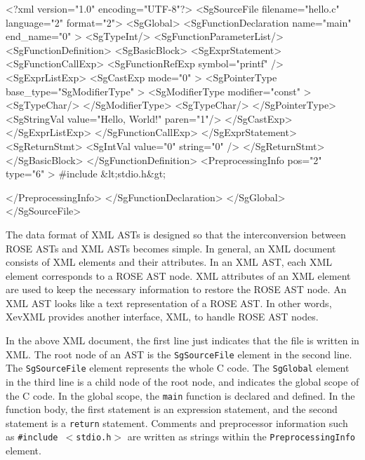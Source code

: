 \begin{framed}
\begin{src}
<?xml version="1.0" encoding="UTF-8"?>
<SgSourceFile filename="hello.c" language="2" format="2">
  <SgGlobal>
    <SgFunctionDeclaration name="main"  end_name="0" >
        <SgTypeInt/>
      <SgFunctionParameterList/>
      <SgFunctionDefinition>
        <SgBasicBlock>
          <SgExprStatement>
            <SgFunctionCallExp>
              <SgFunctionRefExp symbol="printf" />
              <SgExprListExp>
                <SgCastExp mode="0" >
                    <SgPointerType base_type="SgModifierType" >
                      <SgModifierType modifier="const" >
                        <SgTypeChar/>
                      </SgModifierType>
                      <SgTypeChar/>
                    </SgPointerType>
                  <SgStringVal value="Hello, World!\n" paren="1"/>
                </SgCastExp>
              </SgExprListExp>
            </SgFunctionCallExp>
          </SgExprStatement>
          <SgReturnStmt>
            <SgIntVal value="0"  string="0" />
          </SgReturnStmt>
        </SgBasicBlock>
      </SgFunctionDefinition>
<PreprocessingInfo pos="2"  type="6" >
#include &lt;stdio.h&gt;

</PreprocessingInfo>
    </SgFunctionDeclaration>
  </SgGlobal>
</SgSourceFile>
\end{src}
\end{framed}

The data format of XML ASTs is designed so that the interconversion
between ROSE ASTs and XML ASTs becomes simple.  In general, an XML
document consists of XML elements and their attributes. In an XML AST,
each XML element corresponds to a ROSE AST node. XML attributes of an
XML element are used to keep the necessary information to restore the
ROSE AST node.  An XML AST looks like a text representation of a ROSE
AST.  In other words, XevXML provides another interface, XML, to handle
ROSE AST nodes.

In the above XML document, the first line just indicates that the file
is written in XML.  The root node of an AST is the \texttt{SgSourceFile}
element in the second line. The \texttt{SgSourceFile} element represents
the whole C code.  The \texttt{SgGlobal} element in the third line is a
child node of the root node, and indicates the global scope of the C
code. In the global scope, the \texttt{main} function is declared and
defined. In the function body, the first statement is an expression
statement, and the second statement is a \texttt{return}
statement. Comments and preprocessor information such as
\texttt{\#include $<$stdio.h$>$} are written as strings within the
\texttt{PreprocessingInfo} element.

